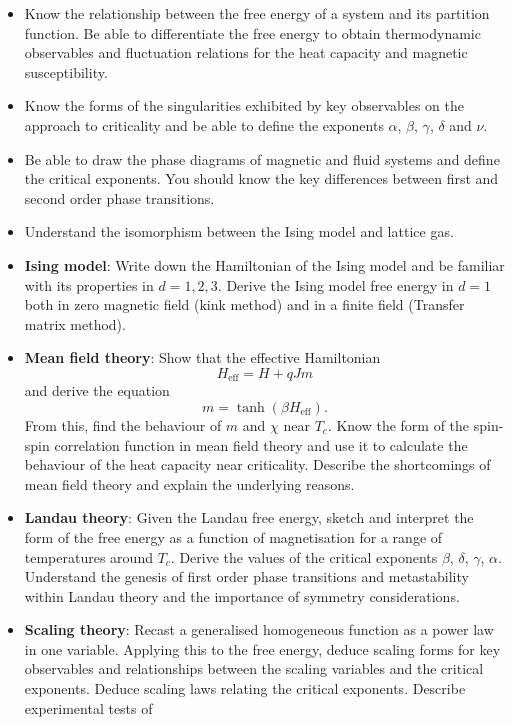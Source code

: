 \documentclass[
  letterpaper,
  enabledeprecatedfontcommands]{report}
\begin{document}
\begin{itemize}
\item
  Know the relationship between the free energy of a system and its
  partition function. Be able to differentiate the free energy to obtain
  thermodynamic observables and fluctuation relations for the heat
  capacity and magnetic susceptibility.
\item
  Know the forms of the singularities exhibited by key observables on
  the approach to criticality and be able to define the exponents
  \(\alpha\), \(\beta\), \(\gamma\), \(\delta\) and \(\nu\).
\item
  Be able to draw the phase diagrams of magnetic and fluid systems and
  define the critical exponents. You should know the key differences
  between first and second order phase transitions.
\item
  Understand the isomorphism between the Ising model and lattice gas.
\item
  \textbf{Ising model}: Write down the Hamiltonian of the Ising model
  and be familiar with its properties in \(d = 1, 2, 3\). Derive the
  Ising model free energy in \(d = 1\) both in zero magnetic field (kink
  method) and in a finite field (Transfer matrix method).
\item
  \textbf{Mean field theory}: Show that the effective Hamiltonian
  \[ H_{\text{eff}} = H + qJm \] and derive the equation
  \[ m = \tanh(\beta H_{\text{eff}}). \] From this, find the behaviour
  of \(m\) and \(\chi\) near \(T_c\). Know the form of the spin-spin
  correlation function in mean field theory and use it to calculate the
  behaviour of the heat capacity near criticality. Describe the
  shortcomings of mean field theory and explain the underlying reasons.
\item
  \textbf{Landau theory}: Given the Landau free energy, sketch and
  interpret the form of the free energy as a function of magnetisation
  for a range of temperatures around \(T_c\). Derive the values of the
  critical exponents \(\beta\), \(\delta\), \(\gamma\), \(\alpha\).
  Understand the genesis of first order phase transitions and
  metastability within Landau theory and the importance of symmetry
  considerations.
\item
  \textbf{Scaling theory}: Recast a generalised homogeneous function as
  a power law in one variable. Applying this to the free energy, deduce
  scaling forms for key observables and relationships between the
  scaling variables and the critical exponents. Deduce scaling laws
  relating the critical exponents. Describe experimental tests of

\end{itemize}
\end{document}
